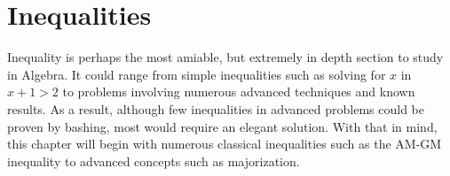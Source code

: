 \documentclass[../main.tex]{subfiles}
\begin{document}
\chapter{Inequalities}

Inequality is perhaps the most amiable, but extremely in depth
section to study in Algebra. It could range from simple inequalities
such as solving for $x$ in $x + 1 > 2$ to problems involving
numerous advanced techniques and known results. As a result,
although few inequalities in advanced problems could be proven by
bashing, most would require an elegant solution. With that in mind,
this chapter will begin with numerous classical inequalities such as
the AM-GM inequality to advanced concepts such as majorization.
\end{document}
